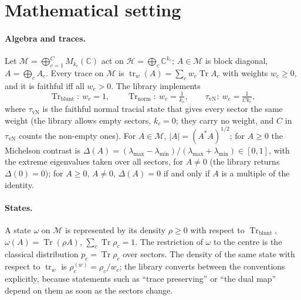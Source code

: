 \documentclass[11pt]{article}
\DeclareMathOperator{\Tr}{Tr}
\newcommand{\C}{\mathbb{C}}
\newcommand{\M}{\mathcal{M}}
\begin{document}
\section{Mathematical setting}\label{sec:math}

\paragraph{Algebra and traces.} Let $\M=\bigoplus_{c=1}^C M_{k_c}(\C)$ act on
$\mathcal H=\bigoplus_c\C^{k_c}$; $A\in\M$ is block diagonal, $A=\bigoplus_c A_c$. Every trace on $\M$ is
$\operatorname{tr}_w(A)=\sum_c w_c\Tr A_c$ with weights $w_c\ge0$, and it is faithful iff all $w_c>0$. The library implements
\[
  \Tr_{\mathrm{blunt}}:\ w_c=1,\qquad \Tr_{\mathrm{norm}}:\ w_c=\tfrac1{k_c},\qquad
  \tau_{\mathrm{vN}}:\ w_c=\tfrac1{Ck_c},
\]
where $\tau_{\mathrm{vN}}$ is the faithful normal tracial state that gives every sector the same weight
(the library allows empty sectors, $k_c=0$; they carry no weight, and $C$ in $\tau_{\mathrm{vN}}$ counts the non-empty ones).
For $A\in\M$, $|A|=(A^*A)^{1/2}$; for $A\ge 0$ the Michelson contrast is
$\Delta(A)=(\lambda_{\max}-\lambda_{\min})/(\lambda_{\max}+\lambda_{\min})\in[0,1]$, with the extreme
eigenvalues taken over all sectors, for $A\ne0$ (the library returns $\Delta(0)=0$); for $A\ge0$, $A\ne0$, $\Delta(A)=0$ if and only if $A$ is a multiple of the identity.

\paragraph{States.} A state $\omega$ on $\M$ is represented by its density $\rho\ge0$ with respect to
$\Tr_{\mathrm{blunt}}$, $\omega(A)=\Tr(\rho A)$, $\sum_c\Tr\rho_c=1$. The restriction of $\omega$ to the
centre is the classical distribution $p_c=\Tr\rho_c$ over sectors. The density of the same state with
respect to $\operatorname{tr}_w$ is $\rho^{(w)}_c=\rho_c/w_c$; the library converts between the
conventions explicitly, because statements such as ``trace preserving'' or ``the dual map'' depend on
them as soon as the sectors change.
\end{document}
